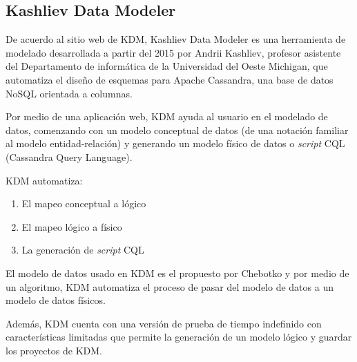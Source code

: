\subsection{Kashliev Data Modeler}
De acuerdo al sitio web de KDM\cite{datafluent_kashliev_2020}, Kashliev Data Modeler es una herramienta de modelado desarrollada a partir del 2015 por Andrii Kashliev, profesor asistente del Departamento de informática de la Universidad del Oeste Michigan, que automatiza el diseño de esquemas para Apache Cassandra, una base de datos NoSQL orientada a columnas. 


Por medio de una aplicación web, KDM ayuda al usuario en el modelado de datos, comenzando con un modelo conceptual de datos (de una notación familiar al modelo entidad-relación) y generando un modelo físico de datos o \textit{script} CQL (Cassandra Query Language). 


KDM automatiza: 

\begin{enumerate}
    \item El mapeo conceptual a lógico
    \item El mapeo lógico a físico
    \item La generación de \textit{script} CQL 
\end{enumerate}

El modelo de datos usado en KDM es el propuesto por Chebotko\cite{chebotko_big_2015} y por medio de un algoritmo, KDM automatiza el proceso de pasar del modelo de datos a un modelo de datos físicos. 


Además, KDM cuenta con una versión de prueba de tiempo indefinido con características limitadas que permite la generación de un modelo lógico y guardar los proyectos de KDM.
